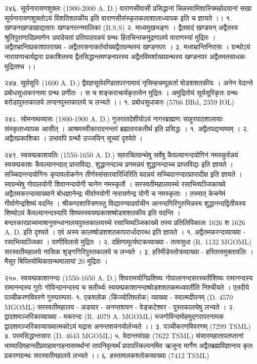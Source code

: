 २४६. सूर्यनारायणशुक्लः (1900-2000 A. D.)
वाराणसीवासी प्रसिद्धानां चिन्नस्वामिशास्त्रिमहोदयानां सखा सूर्यनारायणशुक्लोऽयं विंशतिशतकीय इति वाराणसीसंस्कृतकलाशालाध्यापक इति च ज्ञायते ।।
१. खण्डनखण्डखाद्यसारः खण्डनरत्नमालिका (B.S.S)
२. माध्वमुखभङ्गः । द्वैतवादं खण्डयन् अद्वैतस्य श्रुतिपुराणादिप्रमाणेन उपादेयतां प्रतिपादयन्नयं ग्रन्थः हितचिन्तकमुद्रणालये वाराणस्यां मुद्रितः । अद्वैतभ्रान्तिप्रकाशापराख्य - अद्वैतरसनाकर्तर्याख्यद्वैतग्रन्थस्य खण्डनपरः ।
३. मध्वभ्रान्तिनिरासः । ग्रन्थोऽयं नारायणाचार्यद्वारा प्रकाशितस्य द्वैतसिद्धान्तमण्डनपरस्य अद्वैतविमर्शाख्यग्रन्थस्य खण्डनपर अद्वैतमतसाधकः मुद्रितश्च ।।

२४७. सूर्यसूरिः (1600 A. D.)
द्वैवज्ञसूर्यपण्डितापरनामायं नृसिम्हचम्पूकर्ता षोडशशतकीयः । अनेन वेदान्ते प्रबोधसुधाकरनामा ग्रन्थः प्रणीतः । स च शङ्कराचार्यकृतत्वेन मुद्रितः । अमुद्रितोयं सूर्यसूरिकृतः ग्रन्थः बरोडापुस्तकालये लन्दनपुस्तकालये च लभ्यते ।।
१. प्रबोधसुधाकरः (5766 BRd, 2359 IOL)

२४८. सोमनाथव्यासः (1800-1900 A. D.)
गुजरातदेशीयोऽयं नागरब्राह्मणः साहूरपाठशालायाः संस्कृताध्यापक आसीत् । आश्रमस्वीकारादनन्तरं ब्रह्मतारकतीर्थ इति प्रसिद्धः ।
१. अद्वैतपद्यभाष्यम् ।
२. अद्वैतप्रकाशिका । उभावपि ग्रन्थौ उज्जयिन् सूच्यां दृश्येते ।

२४९. स्वयम्प्रकाशयतिः (1550-1650 A. D.)
स्‌वरचितग्रन्थेषु सर्वेषु कैवल्यानन्दयोगिनं नमस्कुर्वन्नयं स्वयम्प्रकाशः कैवल्यानन्दात् प्राप्तविद्यः, शुद्धानन्दञ्च प्रणमन्नयं शुद्धानन्दाच्च प्राप्तविद्यः इति ज्ञायते । सच्चिदानन्दयोगिनः कृपावलोकनेन तीर्णस्संसारवारिधिरिति वदन्नयं सच्चिदानन्दात्प्राप्तदीक्ष इति ज्ञायते ।
स्वग्रन्थेषु गोपालयोगी शिवानन्दयोगी चानेन नमस्कृतौ । सरस्वतीमहालयस्थे रसाभिव्यञ्जिकाख्ये अद्वैतमकरन्दव्याख्याने बोधज्ञानेन्द्रः मीर्वाणयोगी नारायणेन्द्र योगी च नमस्कृताः । तस्मात् केचनेमं गीर्वाणेन्द्रशिष्यं वदन्ति ।
श्रीकण्ठशास्त्रिणस्तु विद्यारण्यादर्वाचीन आनन्दगिरिगुरुभिन्नस्य शुद्धानन्दद्वितीयस्य शिष्योऽयं कैवल्यानन्दस्यापि शिष्यस्स्वयम्प्रकाशष्षोडशशतकीय इति वदन्ति ।
बन्दरकारप्राच्यभाषानुसन्धानालयपुस्तकालयस्थे रसाभिव्यञ्जिकाख्ये तस्य प्रतिलिपिकालः 1626 श 1626 A. D. इति दृश्यते । एवं अस्य कालष्षोडशशतकापरार्धादारब्ध इति ज्ञायते ।
१. अद्वैतमकरन्दव्याख्या - रसाभिव्याञ्जिका । वाणीविलासे मुद्रितः ।
२. दक्षिणामूर्त्यष्टकव्याख्या - तत्वसुधा (R. 1132 MGOML) सरस्वतीमहालये नासिक शृङ्गगिरिपुस्तकालये च लभ्यते ।
३. हरिमीडेस्तोत्रव्याख्या - हरितत्वमुक्तावलिः । मैसूर बिव्लियोथिकाग्रन्थमालायां 20 मुद्रितः ।

२५०. स्वयम्प्रकाशानन्दः (1550-1650 A. D.)
शिवरामयोगिप्रशिष्यः गोपालानन्दसरस्वतीशिष्यः रामानन्दस्य रामानन्दस्य गुरोः गोविन्दानन्दस्य च सतीर्थ्यः स्वयम्प्रकाशानन्दष्षोडशशतकमध्यवर्तीति निश्चीयते । एतदीये पञ्चीकरणविवरणे गुरुपरम्परा-
१. एकश्लोक (किंज्योतिश्लोक) व्याख्या - स्वात्मदीपनम् (D. 4570 MGOML) सरस्वतीमहालय - अडयार - अनन्तशयन - वेङ्कटेश्वर - पुस्तकालयेषु लभ्यते ।
२. द्वादशमञ्जरिकाव्याख्या - मकरन्दः (R. 4079 A. MGOML) भजगोविन्दमोहमुद्गरापरनामक द्वादशमञ्जरिकाव्याख्यात्मकोऽयं मद्रास अनन्तशयनयोर्लभ्यते ।।
३. पञ्चीकरणविवरणम् (7299 TSML)
४. परमसिद्धान्तसारः (D. 4643 MGOML)
५. वेदान्तसंग्रहः (7622 TSML) संसारमहातापतप्तानां भाष्यादिमहानदीप्रवाहावगाहनासमर्थानां तापनिवृत्यर्थं प्रपापरिकल्पनमिव ऋजुना मार्गेण अद्वैतब्रह्मविज्ञानाय कृतः प्रकरणग्रन्थः सरस्वतीमहालये लभ्यते ।।
६. हस्तामलकश्लोकव्याख्या (7412 TSML)

